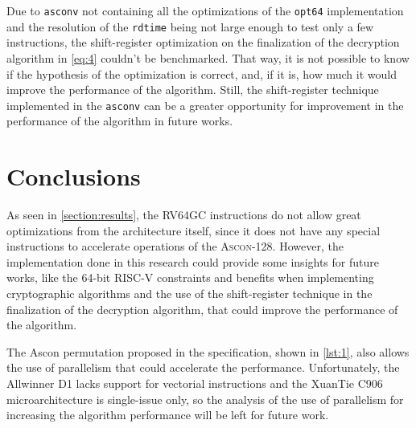 \documentclass[11pt,twoside]{article}
\begin{document}
Due to \texttt{asconv} not containing all the optimizations of the \texttt{opt64} implementation and the resolution of the \texttt{rdtime} being not large enough to test only a few instructions, the shift-register optimization on the finalization of the decryption algorithm in \cref{eq:4} couldn't be benchmarked. That way, it is not possible to know if the hypothesis of the optimization is correct, and, if it is, how much it would improve the performance of the algorithm. Still, the shift-register technique implemented in the \texttt{asconv} can be a greater opportunity for improvement in the performance of the algorithm in future works.

\section{Conclusions}

As seen in \cref{section:results}, the \textsf{RV64GC} instructions do not allow great optimizations from the architecture itself, since it does not have any special instructions to accelerate operations of the \textsc{Ascon-128}. However, the implementation done in this research could provide some insights for future works, like the 64-bit RISC-V constraints and benefits when implementing cryptographic algorithms and the use of the shift-register technique in the finalization of the decryption algorithm, that could improve the performance of the algorithm.

The Ascon permutation proposed in the specification, shown in \cref{lst:1}, also allows the use of parallelism that could accelerate the performance. Unfortunately, the Allwinner D1 lacks support for vectorial instructions and the XuanTie C906 microarchitecture is single-issue only, so the analysis of the use of parallelism for increasing the algorithm performance will be left for future work.
\end{document}
